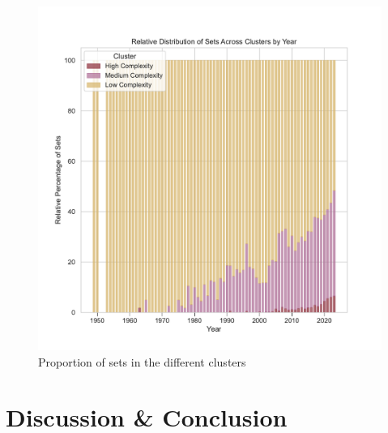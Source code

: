 \documentclass{article}
\theoremstyle{plain}
\theoremstyle{definition}
\theoremstyle{remark}
\begin{document}
\begin{figure}[ht]
 \vskip 0.2in
 \begin{center}
 \centerline{\includegraphics[width=\columnwidth]{../Images/Clusters.pdf}}
\caption{Proportion of sets in the different clusters}
\label{icml-historical}
 \end{center}
 \vskip -0.2in
\end{figure}

\section{Discussion \& Conclusion}\label{sec:conclusion}
\end{document}
